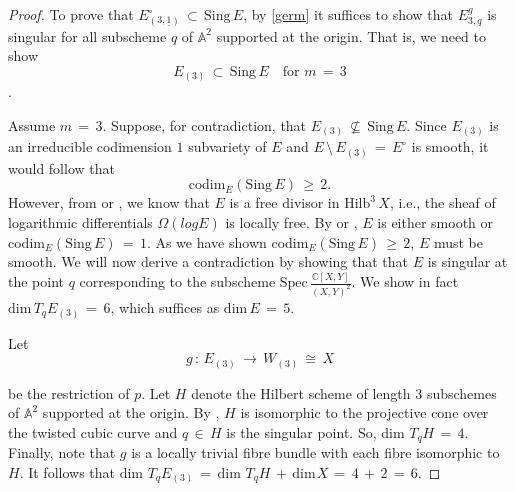 \documentclass[12pt,reqno]{amsart}
\theoremstyle{definition}
\numberwithin{equation}{section}
\begin{document}
\begin{proof}
To prove that $E^{\circ}_{(3,\underline{1})}\,\subset\, \textrm{Sing}\,E$, by \eqref{germ} it suffices to show that $E^{g}_{3,q}$ is singular for all subscheme $q$ of $\mathbb{A}^{2}$ supported at the origin. That is, we need to show 
$$E_{(3)}\,\subset\, \textrm{Sing}\,E \quad \textrm{for}\,\, m\,=\,3$$.

Assume $m\,=\,3$. Suppose, for contradiction, that $E_{(3)}\,\nsubseteq\,\textrm{Sing}\,E$. Since $E_{(3)}$ is an irreducible codimension $1$ subvariety of $E$ and $E\,\setminus\, E_{(3)}\,=\, E^{\circ}$ is smooth, it would follow that 
$$\textrm{codim}_{E}(\textrm{Sing}\,E)\,\geq\,2.$$
However, from \cite{BEG} or \cite[Theorem B]{Sta}, we know that $E$ is a free divisor in $\textrm{Hilb}^{3}\,X$, i.e., the sheaf of logarithmic differentials $\Omega(log E)$ is locally free. By {\cite[Section 2]{aleksandrov1990nonisolated}} or \cite[Section 1.4]{BEG}, $E$ is either smooth or codim${_{E}}(\textrm{Sing}\,E)\,=\,1$. As we have shown codim${_{E}}(\textrm{Sing}\,E)\,\geq\,2$, $E$ must be smooth. We will now derive a contradiction by showing that  that $E$ is singular at the point $q$ corresponding to the subscheme $\textrm{Spec}\,\frac{\mathbb{C}[X,Y]}{(X,Y)^{2}}$. We show in fact $\textrm{dim}\,T_{q}E_{(3)}\,=\, 6$, which suffices as dim$\,E\,=\, 5$.

Let 
$$g\,:\,E_{(3)}\,\longrightarrow\,W_{(3)}\,\cong\,X$$

be the restriction of $p$. Let $H$ denote the Hilbert scheme of length $3$ subschemes of $\mathbb{A}^{2}$ supported at the origin. By \cite[Section 4]{Br}, $H$ is isomorphic to the projective cone over the twisted cubic curve and $q\, \in\, H $ is the singular point. So, dim $ T_{q}H\,=\,4$. 
Finally, note that $g$ is a locally trivial fibre bundle with each fibre isomorphic to $H$. It follows that $\textrm{dim } T_{q}E_{(3)}\,=\,\textrm{dim } T_{q}H \,+\, \textrm{dim} \hspace{1pt} X\,=\, 4\,+\,2\, =\,6.$    
\end{proof}
\end{document}
